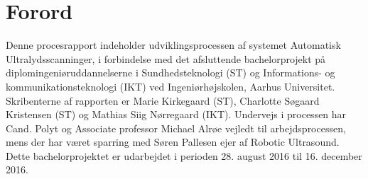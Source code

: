 \chapter{Forord}\label{kapForord}
Denne procesrapport indeholder udviklingsprocessen af systemet Automatisk Ultralydsscanninger, i forbindelse med det afsluttende bachelorprojekt på diplomingeniøruddannelserne i Sundhedsteknologi (ST) og Informations- og kommunikationsteknologi (IKT) ved Ingeniørhøjskolen, Aarhus Universitet. Skribenterne af rapporten er Marie Kirkegaard (ST), Charlotte Søgaard Kristensen (ST) og Mathias Siig Nørregaard (IKT). Undervejs i processen har Cand. Polyt og Associate professor Michael Alrøe vejledt til arbejdsprocessen, mens der har været sparring med Søren Pallesen ejer af Robotic Ultrasound. Dette bachelorprojektet er udarbejdet i perioden 28. august 2016 til 16. december 2016.
